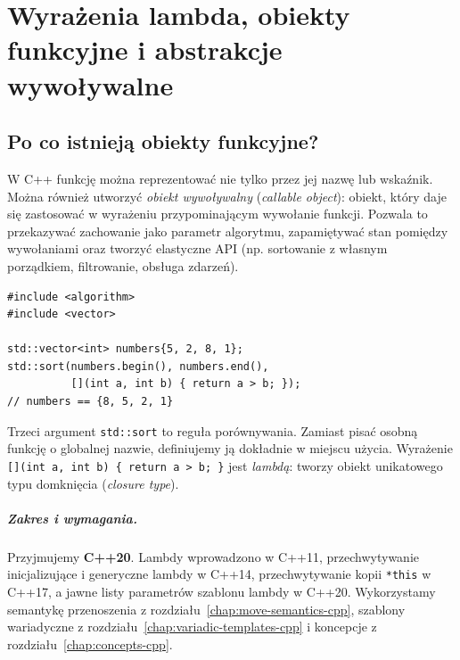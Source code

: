 
\chapter[Lambdy i obiekty funkcyjne]{Wyrażenia lambda, obiekty funkcyjne i abstrakcje wywoływalne}
\label{chap:lambdas-cpp}

\section{Po co istnieją obiekty funkcyjne?}

W C++ funkcję można reprezentować nie tylko przez jej nazwę lub wskaźnik.
Można również utworzyć \emph{obiekt wywoływalny} (\textit{callable object}):
obiekt, który daje się zastosować w wyrażeniu przypominającym wywołanie
funkcji. Pozwala to przekazywać zachowanie jako parametr algorytmu,
zapamiętywać stan pomiędzy wywołaniami oraz tworzyć elastyczne API
(np. sortowanie z własnym porządkiem, filtrowanie, obsługa zdarzeń).

\begin{lstlisting}
#include <algorithm>
#include <vector>

std::vector<int> numbers{5, 2, 8, 1};
std::sort(numbers.begin(), numbers.end(),
          [](int a, int b) { return a > b; });
// numbers == {8, 5, 2, 1}
\end{lstlisting}

Trzeci argument \texttt{std::sort} to reguła porównywania. Zamiast pisać
osobną funkcję o globalnej nazwie, definiujemy ją dokładnie w miejscu
użycia. Wyrażenie \texttt{[](int a, int b) \{ return a > b; \}}
jest \emph{lambdą}: tworzy obiekt unikatowego typu domknięcia
(\textit{closure type}).

\paragraph{Zakres i wymagania.}
Przyjmujemy \textbf{C++20}. Lambdy wprowadzono w C++11, przechwytywanie
inicjalizujące i generyczne lambdy w C++14, przechwytywanie kopii
\texttt{*this} w C++17, a jawne listy parametrów szablonu lambdy
w C++20. Wykorzystamy semantykę przenoszenia z rozdziału~\ref{chap:move-semantics-cpp},
szablony wariadyczne z rozdziału~\ref{chap:variadic-templates-cpp}
i koncepcje z rozdziału~\ref{chap:concepts-cpp}.

